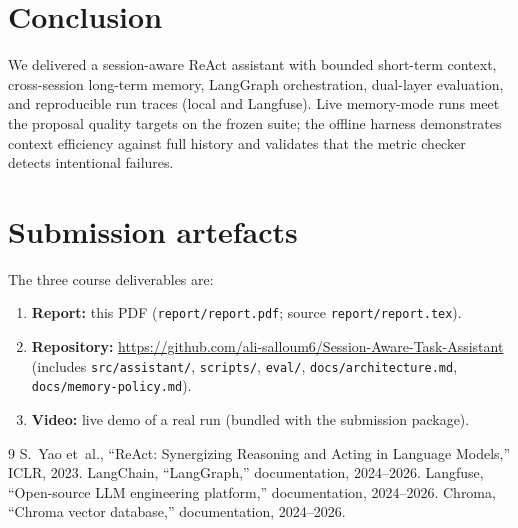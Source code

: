 \documentclass[11pt,a4paper]{article}
\begin{document}
\section{Conclusion}

We delivered a session-aware ReAct assistant with bounded short-term context, cross-session long-term memory, LangGraph orchestration, dual-layer evaluation, and reproducible run traces (local and Langfuse). Live memory-mode runs meet the proposal quality targets on the frozen suite; the offline harness demonstrates context efficiency against full history and validates that the metric checker detects intentional failures.

\section*{Submission artefacts}

The three course deliverables are:
\begin{enumerate}[leftmargin=*]
  \item \textbf{Report:} this PDF (\texttt{report/report.pdf}; source \texttt{report/report.tex}).
  \item \textbf{Repository:}
    \url{https://github.com/ali-salloum6/Session-Aware-Task-Assistant}
    (includes \texttt{src/assistant/}, \texttt{scripts/}, \texttt{eval/},
    \texttt{docs/architecture.md}, \texttt{docs/memory-policy.md}).
  \item \textbf{Video:} live demo of a real run (bundled with the submission package).
\end{enumerate}

\begin{thebibliography}{9}
  S.~Yao et~al., ``ReAct: Synergizing Reasoning and Acting in Language Models,'' ICLR, 2023.
  LangChain, ``LangGraph,'' documentation, 2024--2026.
  Langfuse, ``Open-source LLM engineering platform,'' documentation, 2024--2026.
  Chroma, ``Chroma vector database,'' documentation, 2024--2026.
\end{thebibliography}
\end{document}
